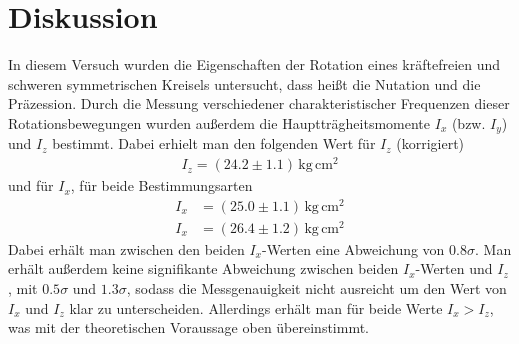 \documentclass[12pt,a4paper,german]{scrartcl}
\numberwithin{equation}{section}
\begin{document}
  \newpage
  \section{Diskussion}
  In diesem Versuch wurden die Eigenschaften der Rotation eines kräftefreien und schweren symmetrischen Kreisels untersucht, dass heißt die Nutation und die Präzession.
  Durch die Messung verschiedener charakteristischer Frequenzen dieser Rotationsbewegungen wurden außerdem die Hauptträgheitsmomente $I_x$ (bzw. $I_y$) und $I_z$ bestimmt.
  Dabei erhielt man den folgenden Wert für $I_z$ (korrigiert)
  \begin{align}
    I_z = (24.2 \pm 1.1) \, \text{kg} \, \text{cm}^2
  \end{align}
  und für $I_x$, für beide Bestimmungsarten
  \begin{align}
    I_x &= (25.0 \pm 1.1) \, \text{kg} \, \text{cm}^2 \nonumber \\
    I_x &= (26.4 \pm 1.2) \, \text{kg} \, \text{cm}^2
  \end{align}
  Dabei erhält man zwischen den beiden $I_x$-Werten eine Abweichung von $0.8\sigma$. Man erhält außerdem keine signifikante Abweichung zwischen beiden $I_x$-Werten und $I_z$, mit $0.5\sigma$ und $1.3\sigma$, sodass die Messgenauigkeit nicht ausreicht um den Wert von $I_x$ und $I_z$ klar zu unterscheiden.
  Allerdings erhält man für beide Werte $I_x > I_z$, was mit der theoretischen Voraussage oben übereinstimmt.
\end{document}
